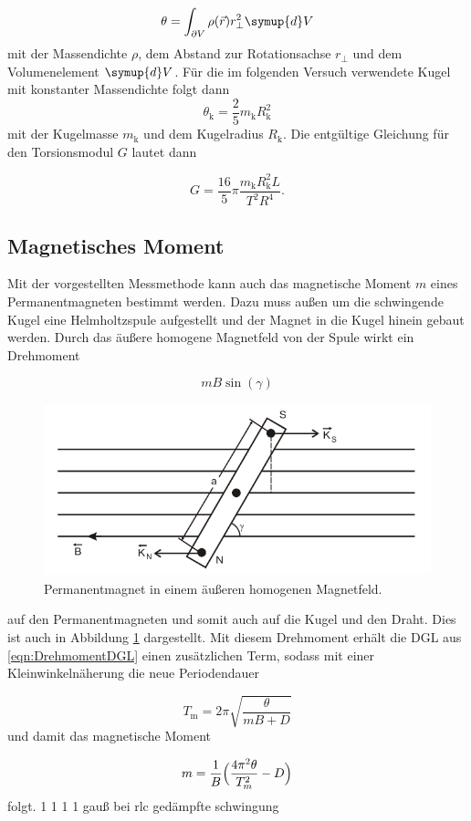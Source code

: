 \begin{equation}
  \theta = \int_{\partial V}^{} \rho(\vec{r}) r_\perp^2 \symup{d}V
\end{equation}
mit der Massendichte $\rho$, dem Abstand zur Rotationsachse $r_\perp$ und dem
Volumenelement $\symup{d}V$.
Für die im folgenden Versuch verwendete Kugel mit konstanter Massendichte
folgt dann
\begin{equation}
  \theta_\text{k} = \frac{2}{5} m_\text{k} R_\text{k}^2
\end{equation}
mit der Kugelmasse $m_\text{k}$ und dem Kugelradius $R_\text{k}$.
Die entgültige Gleichung für den Torsionsmodul $G$ lautet dann

\begin{equation}
  G = \frac{16}{5} \pi \frac{m_\text{k}R_\text{k}^2 L}{T^2 R^4}.
  \label{eqn:schubG}
\end{equation}


\subsection{Magnetisches Moment}

Mit der vorgestellten Messmethode kann auch das magnetische Moment
$m$ eines Permanentmagneten bestimmt werden.
Dazu muss außen um die schwingende Kugel
eine Helmholtzspule aufgestellt und der Magnet in die Kugel hinein gebaut
werden.
Durch das äußere homogene Magnetfeld von der Spule wirkt ein Drehmoment

\begin{equation}
  mB\sin(\gamma)
\end{equation}

\begin{figure}
  \centering
  \includegraphics[height=5cm]{magnMom.png}
  \caption{Permanentmagnet in einem äußeren homogenen Magnetfeld.}
  \label{fig:MagnetMoment}
\end{figure}

auf den Permanentmagneten und somit auch auf die Kugel und den Draht.
Dies ist auch in Abbildung \ref{fig:MagnetMoment} dargestellt.
Mit diesem Drehmoment erhält die DGL aus \eqref{eqn:DrehmomentDGL} einen
zusätzlichen Term, sodass mit einer Kleinwinkelnäherung
die neue Periodendauer

\begin{equation}
  T_\text{m} = 2\pi \sqrt{\frac{\theta}{mB+D}}
  \label{eqn:altmagmom}
\end{equation}
und damit das magnetische Moment

\begin{equation}
  m = \frac{1}{B}\Bigl(\frac{4 \pi^2 \theta}{T_m^2}-D\Bigr)
\end{equation}
folgt.
1
1
1
1
gauß bei rlc gedämpfte schwingung
\cite{sample}
